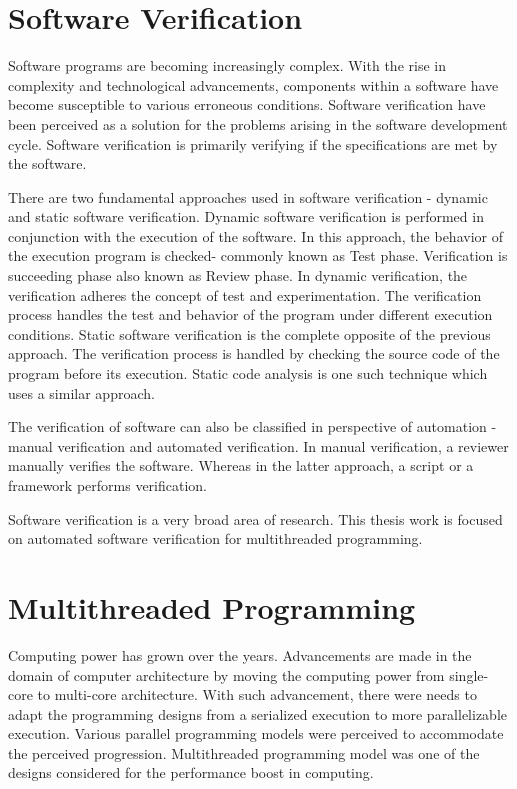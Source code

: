 \section{Software Verification}

Software programs are becoming increasingly complex. 
With the rise in complexity and technological advancements, components within a software have become susceptible to various erroneous conditions. 
Software verification have been perceived as a solution for the problems arising in the software development cycle. 
Software verification is primarily verifying if the specifications are met by the software\cite{ghezzi2002fundamentals}.

There are two fundamental approaches used in software verification - dynamic and static software verification\cite{ghezzi2002fundamentals}. 
Dynamic software verification is performed in conjunction with the execution of the software. 
In this approach, the behavior of the execution program is checked- commonly known as Test phase. 
Verification is succeeding phase also known as Review phase. 
In dynamic verification, the verification adheres the concept of test and experimentation. 
The verification process handles the test and behavior of the program under different execution conditions. 
Static software verification is the complete opposite of the previous approach. 
The verification process is handled by checking the source code of the program before its execution. 
Static code analysis is one such technique which uses a similar approach. 

The verification of software can also be classified in perspective of automation - manual verification and automated verification. 
In manual verification, a reviewer manually verifies the software. 
Whereas in the latter approach, a script or a framework performs  verification. 

Software verification is a very broad area of research. 
This thesis work is focused on automated software verification for multithreaded programming. 

\section{Multithreaded Programming}

Computing power has grown over the years. 
Advancements are made in the domain of computer architecture by moving the computing power from single-core to multi-core architecture. 
With such advancement, there were needs to adapt the programming designs from a serialized execution to more parallelizable execution. 
Various parallel programming models were perceived to accommodate the perceived progression. 
Multithreaded programming model was one of the designs considered for the performance boost in computing\cite{carver2005modern}. 

